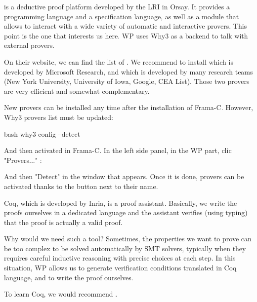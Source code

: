 

 is a deductive proof platform
developed by the LRI in Orsay. It
provides a programming language and a specification language, as well as
a module that allows to interact with a wide variety of automatic and
interactive provers. This point is the one that interests us here. WP uses
Why3 as a backend to talk with external provers.


On their website, we can find the list of
.
We recommend to install
 which is
developed by Microsoft Research, and
 which is developed by many
research teams (New York University, University of Iowa, Google, CEA
List). Those two provers are very efficient and somewhat complementary.


New provers can be installed any time after the installation of Frama-C.
However, Why3 provers list must be updated:

\begin{CodeBlock}{bash}
why3 config --detect
\end{CodeBlock}

And then activated in Frama-C. In the left side panel, in the WP part,
clic "Provers..." :




And then "Detect" in the window that appears. Once it is done, provers
can be activated thanks to the button next to their name.






Coq, which is developed by Inria, is a proof assistant. Basically, we
write the proofs ourselves in a dedicated language and the assistant
verifies (using typing) that the proof is actually a valid proof.



Why would we need such a tool? Sometimes, the properties we want to
prove can be too complex to be solved automatically by SMT solvers,
typically when they requires careful inductive reasoning with precise
choices at each step. In this situation, WP allows us to generate
verification conditions translated in Coq language, and to write the
proof ourselves.




To learn Coq, we would recommend
.



